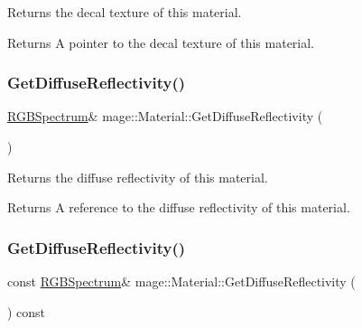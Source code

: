 Returns the decal texture of this material.

\begin{DoxyReturn}{Returns}
A pointer to the decal texture of this material. 
\end{DoxyReturn}
\hypertarget{structmage_1_1_material_afb37e1cd37df82b6607a4e5998e58ea8}{}\label{structmage_1_1_material_afb37e1cd37df82b6607a4e5998e58ea8} 
\subsubsection{\texorpdfstring{Get\+Diffuse\+Reflectivity()}{GetDiffuseReflectivity()}\hspace{0.1cm}{\footnotesize\ttfamily [1/2]}}
{\footnotesize\ttfamily \hyperlink{structmage_1_1_r_g_b_spectrum}{R\+G\+B\+Spectrum}\& mage\+::\+Material\+::\+Get\+Diffuse\+Reflectivity (\begin{DoxyParamCaption}{ }\end{DoxyParamCaption})\hspace{0.3cm}{\ttfamily [noexcept]}}

Returns the diffuse reflectivity of this material.

\begin{DoxyReturn}{Returns}
A reference to the diffuse reflectivity of this material. 
\end{DoxyReturn}
\hypertarget{structmage_1_1_material_a046b0d8eece74bd68538fefd03c1f294}{}\label{structmage_1_1_material_a046b0d8eece74bd68538fefd03c1f294} 
\subsubsection{\texorpdfstring{Get\+Diffuse\+Reflectivity()}{GetDiffuseReflectivity()}\hspace{0.1cm}{\footnotesize\ttfamily [2/2]}}
{\footnotesize\ttfamily const \hyperlink{structmage_1_1_r_g_b_spectrum}{R\+G\+B\+Spectrum}\& mage\+::\+Material\+::\+Get\+Diffuse\+Reflectivity (\begin{DoxyParamCaption}{ }\end{DoxyParamCaption}) const\hspace{0.3cm}{\ttfamily [noexcept]}}

